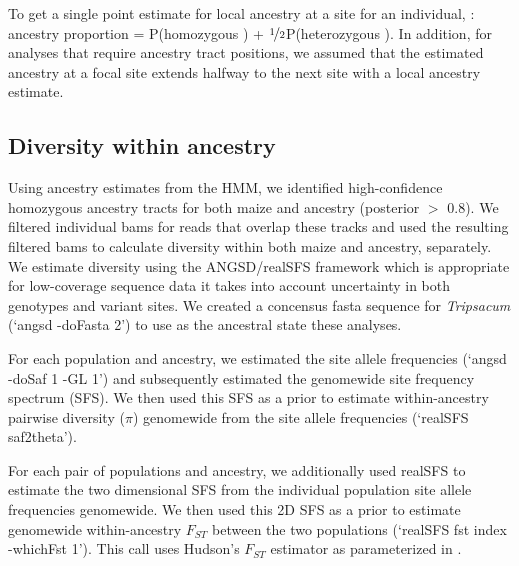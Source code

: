 To get a single point estimate for local ancestry at a site for an individual, : \mexicana ancestry proportion = P(homozygous \mexicana) + $\nicefrac{1}{2}$P(heterozygous ). 
In addition, for analyses that require ancestry tract positions, we assumed that the estimated ancestry at a focal site extends halfway to the next site with a local ancestry estimate. 

\subsection*{Diversity within ancestry}
Using \mexicana ancestry estimates from the HMM, we identified high-confidence homozygous ancestry tracts for both maize and \mexicana ancestry (posterior $>$ 0.8). 
We filtered individual bams for reads that overlap these tracks and used the resulting filtered bams to calculate diversity within both maize and 
\mexicana ancestry, separately. 
We estimate diversity using the ANGSD/realSFS framework which is appropriate for low-coverage sequence data it takes into account uncertainty in both genotypes and variant sites. 
We created a concensus fasta sequence for \textit{Tripsacum} (‘angsd -doFasta 2') to use as the ancestral state  these analyses.

For each population and ancestry, we estimated the site allele frequencies (‘angsd -doSaf 1 -GL 1') and subsequently estimated the genomewide site frequency spectrum (SFS). We then used this SFS as a prior to estimate within-ancestry pairwise diversity ($\pi$) genomewide from the site allele frequencies (‘realSFS saf2theta'). 

For each pair of populations and ancestry, we additionally used realSFS to estimate the two dimensional SFS from the individual population site allele frequencies genomewide. We then used this 2D SFS as a prior to estimate genomewide within-ancestry $F_{ST}$ between the two populations (‘realSFS fst index -whichFst 1'). 
This call uses Hudson's $F_{ST}$ estimator \cite{Hudson:1992_fst} as parameterized in \cite{Bhatia:2013_fst}.

